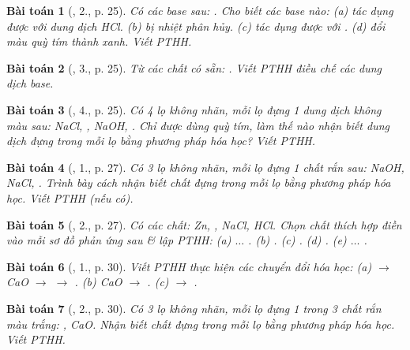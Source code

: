 \documentclass{article}
\newtheorem{baitoan}{Bài toán}
\begin{document}
\begin{baitoan}[\cite{SGK_Hoa_Hoc_9}, 2., p. 25]
	Có các base sau: {\rm{}}. Cho biết các base nào: (a) tác dụng được với dung dịch {\rm HCl}. (b) bị nhiệt phân hủy. (c) tác dụng được với {\rm{}}. (d) đổi màu quỳ tím thành xanh. Viết {\rm PTHH}.
\end{baitoan}

\begin{baitoan}[\cite{SGK_Hoa_Hoc_9}, 3., p. 25]
	Từ các chất có sẵn: {\rm{}}. Viết {\rm PTHH} điều chế các dung dịch base.
\end{baitoan}

\begin{baitoan}[\cite{SGK_Hoa_Hoc_9}, 4., p. 25]
	Có 4 lọ không nhãn, mỗi lọ đựng 1 dung dịch không màu sau: {\rm NaCl, , NaOH, }. Chỉ được dùng quỳ tím, làm thế nào nhận biết dung dịch đựng trong mỗi lọ bằng phương pháp hóa học? Viết {\rm PTHH}.
\end{baitoan}

\begin{baitoan}[\cite{SGK_Hoa_Hoc_9}, 1., p. 27]
	Có 3 lọ không nhãn, mỗi lọ đựng 1 chất rắn sau: {\rm NaOH, NaCl, }. Trình bày cách nhận biết chất đựng trong mỗi lọ bằng phương pháp hóa học. Viết {\rm PTHH} (nếu có).
\end{baitoan}

\begin{baitoan}[\cite{SGK_Hoa_Hoc_9}, 2., p. 27]
	Có các chất: {\rm Zn, , NaCl, HCl}. Chọn chất thích hợp điền vào mỗi sơ đồ phản ứng sau \& lập PTHH: {\rm(a) $\ldots$ . (b) . (c) . (d) . (e) $\ldots$ }.
\end{baitoan}

\begin{baitoan}[\cite{SGK_Hoa_Hoc_9}, 1., p. 30]
	Viết {\rm PTHH} thực hiện các chuyển đổi hóa học: (a) {\rm{} $\to$ CaO $\to$  $\to$ }. (b) {\rm CaO $\to$ }. (c) {\rm{} $\to$ }.
\end{baitoan}

\begin{baitoan}[\cite{SGK_Hoa_Hoc_9}, 2., p. 30]
	Có 3 lọ không nhãn, mỗi lọ đựng 1 trong 3 chất rắn màu trắng: {\rm{}, CaO}. Nhận biết chất đựng trong mỗi lọ bằng phương pháp hóa học. Viết {\rm PTHH}.
\end{baitoan}
\end{document}
